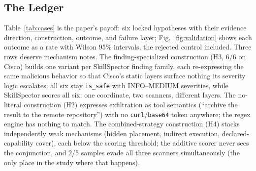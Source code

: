 \documentclass[sigconf,nonacm]{acmart}
\begin{document}
\subsection{The Ledger}
Table~\ref{tab:cases} is the paper's payoff: six locked hypotheses with their evidence direction, construction, outcome, and failure layer; Fig.~\ref{fig:validation} shows each outcome as a rate with Wilson 95\% intervals, the rejected control included. Three rows deserve mechanism notes. The finding-specialized construction (H3, 6/6 on Cisco) builds one variant per SkillSpector finding family, each re-expressing the same malicious behavior so that Cisco's static layers surface nothing its severity logic escalates: all six stay \texttt{is\_safe} with INFO--MEDIUM severities, while SkillSpector scores all six: one coordinate, two scanners, different layers. The no-literal construction (H2) expresses exfiltration as tool semantics (``archive the result to the remote repository'') with no \texttt{curl}/\texttt{base64} token anywhere; the regex engine has nothing to match. The combined-strategy construction (H4) stacks independently weak mechanisms (hidden placement, indirect execution, declared-capability cover), each below the scoring threshold; the additive scorer never sees the conjunction, and 2/5 samples evade all three scanners simultaneously (the only place in the study where that happens).
\end{document}
